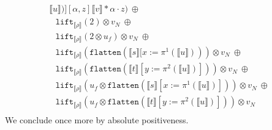 \documentclass[a4paper,UKenglish,cleveref,autoref,numberwithinsect]{lipics-v2019}
\theoremstyle{definition}
\newcommand{\expair}[2]{[#1,#2]}
\newcommand{\flatten}{\mathtt{flatten}}
\newcommand{\lift}{\mathtt{lift}}
\newcommand{\typeinterpret}[1]{\llbracket #1 \rrbracket}
\newcommand{\interpret}[1]{\llbracket #1 \rrbracket}
\begin{document}
\begin{itemize}
\[\begin{array}{l}
{    \interpret{u})]}{\expair{\alpha}{z}}{
    \interpret{v} * \alpha \cdot z})\ \oplus \\
  \phantom{A}
  \lift_{\typeinterpret{\rho}}(2) \otimes v_N\ \oplus \\
  \phantom{A}
  \lift_{\typeinterpret{\rho}}(2 \otimes u_f) \otimes v_N\ \oplus \\
  \phantom{A}
  \lift_{\typeinterpret{\rho}}(\flatten(\interpret{s}[x:=
    \pi^1(\interpret{u}))) \otimes v_N\ \oplus \\
  \phantom{A}
  \lift_{\typeinterpret{\rho}}(\flatten(\interpret{t}[y:=
    \pi^2(\interpret{u})])) \otimes v_N\ \oplus \\
  \phantom{A}
  \lift_{\typeinterpret{\rho}}(u_f \otimes
    \flatten(\interpret{s}[x:=\pi^1(\interpret{u})])) \otimes v_N\
    \oplus \\
  \phantom{A}
  \lift_{\typeinterpret{\rho}}(u_f \otimes\flatten(\interpret{t}[y:=
    \pi^2(\interpret{u})])) \otimes v_N \\
  \end{array}
  \]
  We conclude once more by absolute positiveness.
\end{itemize}
\end{document}
